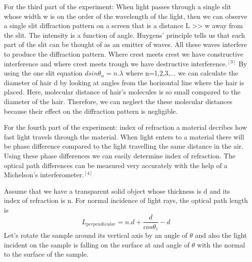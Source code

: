 \documentclass[11pt,a4paper]{article}
\begin{document}
{\begin{figure}[H]
\begin{center}
	    	\end{center}
	    \end{figure}
    \par For the third part of the experiment: When light passes through a single slit whose width w is on the order of the wavelength of the light, then we can observe a single slit diffraction pattern on a screen that is a distance L >> w away from the slit.  The intensity is a function of angle.  Huygens' principle tells us that each part of the slit can be thought of as an emitter of waves.  All these waves interfere to produce the diffraction pattern.  Where crest meets crest we have constructive interference and where crest meets trough we have destructive interference.$^{[3]}$
    By using the one slit equation $dsin\theta_n=n.\lambda$ where n=1,2,3,... we can calculate the diameter of hair d by looking at angles from the horizontal line where the hair is placed. Here, molecular distance of hair's molecules is so small compared to the diameter of the hair. Therefore, we can neglect the these molecular distances because their effect on the diffraction pattern is negligible.
    \par For the fourth part of the experiment: index of refraction a material decribes how fast light travels through the material. When light enters to a material there will be phase difference compared to the light travelling the same distance in the air. Using these phase differences we can easily determine index of refraction. The optical path differences can be measured very accurately with the help of a Michelson's interferometer.$^{[4]}$
    \par Assume that we have a transparent solid object whose thickness is d and its index of refraction is n. For normal incidence of light rays, the optical path length is
    \begin{equation}
    L_{perpendicular}=n.d+\frac{d}{cos\theta_i}-d
    \end{equation}
		Let's rotate the sample around its vertical axis by an angle of $\theta$ and also the light incident on the sample is falling on the surface at and angle of $\theta$ with the normal to the surface of the sample.
			\begin{figure}[H]
			\begin{center}

\end{center}
\end{figure}}
\end{document}
